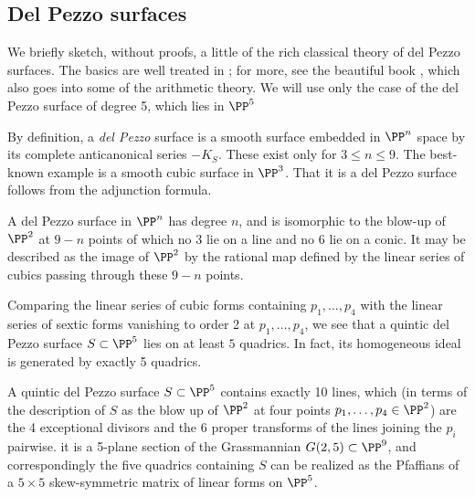 \subsection{Del Pezzo surfaces}

We briefly sketch, without proofs, a little of the 
 rich classical theory of del Pezzo surfaces. The basics are well treated in \cite[pp. 45--50]{Beauville}; for more, see the
beautiful book \cite{Manin}, which also goes into some of the arithmetic theory. We will use only the case of the del Pezzo surface of degree 5, which lies in $\PP^{5}$

By definition,
a \emph{del Pezzo} surface is a smooth surface embedded in $\PP^n$ space by its complete anticanonical series $-K_S$. These exist only for $3\leq n\leq 9$. The best-known example is a smooth cubic surface in $\PP^3$. That it is a del Pezzo surface follows from the adjunction formula.

A del Pezzo surface in $\PP^n$ has degree $n$, and is isomorphic to the blow-up of $\PP^2$ at $9-n$ points of which no 3 lie on a line and no 6 lie on a conic. It may be described as the image of $\PP^2$ by the rational map defined by the linear series of cubics passing through these $9-n$ points. 



Comparing the linear series  of cubic forms containing $p_1,\dots,p_4$ with the linear series  of sextic forms vanishing to order 2 at $p_1,\dots,p_4$, we see that a quintic del Pezzo surface $S \subset \PP^5$ lies on at least $5$ quadrics. In fact, its homogeneous ideal is generated by exactly 5 quadrics.


%
%
%


A quintic del Pezzo surface $S \subset \PP^5$ contains exactly 10 lines, which (in terms of the description of $S$ as the blow up of $\PP^2$ at four points $p_1,\dots,p_4 \in \PP^2$) are the 4 exceptional divisors and the 6 proper transforms of the lines joining the $p_i$ pairwise. 
 it is a 5-plane section of the Grassmannian $G(2,5) \subset \PP^9$, and correspondingly the five quadrics containing $S$ can be realized as the Pfaffians of a  $5\times 5$ skew-symmetric matrix of linear forms on $\PP^5$. 

